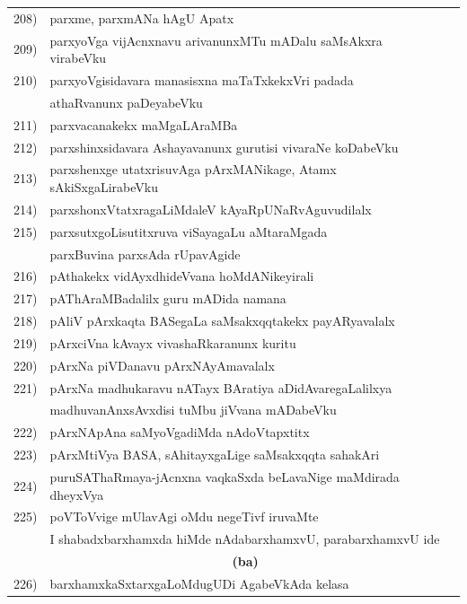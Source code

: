 {\begin{longtable}{@{}cp{7.4cm}r}
208) & parxme, parxmANa hAgU Apatx & \pageref{page135}\\
209) & parxyoVga vijAcnxnavu arivanunxMTu mADalu saMsAkxra virabeVku & \pageref{page162}\\
210) & parxyoVgisidavara manasisxna maTaTxkekxVri padada & \\
     & athaRvanunx paDeyabeVku & \pageref{page216}\\
211) & parxvacanakekx maMgaLAraMBa & \pageref{page102}\\ 
212) & parxshinxsidavara Ashayavanunx gurutisi vivaraNe koDabeVku & \pageref{page218}\\
213) & parxshenxge utatxrisuvAga pArxMANikage, Atamx sAkiSxgaLirabeVku & \pageref{page141}\\
214) & parxshonxVtatxragaLiMdaleV kAyaRpUNaRvAguvudilalx & \pageref{page213}\\
215) & parxsutxgoLisutitxruva viSayagaLu aMtaraMgada  & \\
     & parxBuvina parxsAda rUpavAgide & \pageref{page130}\\
216) & pAthakekx vidAyxdhideVvana hoMdANikeyirali & \pageref{page64}\\
217) & pAThAraMBadalilx guru mADida namana & \pageref{page64}\\
218) & pAliV pArxkaqta BASegaLa saMsakxqqtakekx payARyavalalx & \pageref{page44}\\
219) & pArxciVna kAvayx vivashaRkaranunx kuritu & \pageref{page247}\\
220) & pArxNa piVDanavu pArxNAyAmavalalx &\pageref{page202}\\  
221) & pArxNa madhukaravu nATayx BAratiya aDidAvaregaLalilxya & \\
     & madhuvanAnxsAvxdisi tuMbu jiVvana mADabeVku & \pageref{page81}\\
222) & pArxNApAna saMyoVgadiMda nAdoVtapxtitx & \pageref{page170}\\
223) & pArxMtiVya BASA, sAhitayxgaLige saMsakxqqta sahakAri & \pageref{page36}\\
224) & puruSAThaRmaya-jAcnxna vaqkaSxda beLavaNige maMdirada dheyxVya & \pageref{page65}\\
225) & poVToVvige mUlavAgi oMdu negeTivf iruvaMte  & \\
     & I shabadxbarxhamxda hiMde nAdabarxhamxvU, parabarxhamxvU ide & \pageref{page199}\\[0.4cm]
     &  \multicolumn{1}{c}{\textbf{(ba)}} & \\[0.4cm]
226) & barxhamxkaSxtarxgaLoMdugUDi AgabeVkAda kelasa & \pageref{page92}\\

\end{longtable}}
